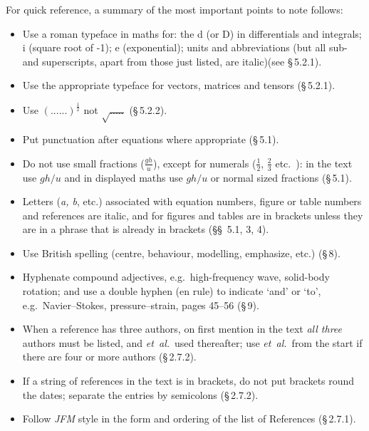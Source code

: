 \documentclass{jfm}
\newcommand\etal{\mbox{\textit{et al.}}}
\begin{document}
For quick reference, a summary of the most important points to note follows:
\begin{itemize}
\item Use a roman typeface in maths for:  the d (or D) in
differentials and integrals; i (square root of -1); e (exponential);
units and abbreviations (but all sub- and superscripts, apart from
those just listed, are italic)(see \S\,5.2.1).

\item  Use the appropriate typeface for vectors, matrices and tensors
(\S\,5.2.1).

\item  Use $(......)^{\frac{1}{2}}$   not  $\sqrt{.....}$ (\S\,5.2.2).

\item  Put punctuation after equations where appropriate (\S\,5.1).

\item  Do not use small fractions  ($\frac{gh}{u}$),  except for
numerals ($\frac{1}{2}$,  $\frac{2}{3}$ etc.\ ): in the text use $gh/u$
and in displayed maths use $gh/u$ or normal sized fractions (\S\,5.1).

\item  Letters (\textit{a, b}, etc.) associated with  equation numbers,
figure or table  numbers and references are italic, and for figures
and tables are in brackets unless they are in a phrase that is already
in brackets (\S\S\, 5.1,  3, 4).

\item Use British spelling (centre, behaviour, modelling, emphasize,
etc.)  (\S\,8).

\item  Hyphenate compound adjectives, e.g.\ high-frequency wave,
solid-body rotation; and use a double hyphen (en rule) to indicate
`and' or `to', e.g.\ Navier--Stokes, pressure--strain, pages 45--56 (\S\,9).

\item  When a reference has three authors, on first mention in the
text \emph{all three} authors must be listed, and \etal\ used
thereafter; use \etal\ from the start if there are four or more authors
(\S\,2.7.2).

\item  If a string of references in the text is in brackets, do not put
brackets round the dates; separate the entries by semicolons (\S\,2.7.2).

\item  Follow \textit{JFM} style in the form and ordering of the list of
References (\S\,2.7.1).
\end{itemize}
\end{document}
